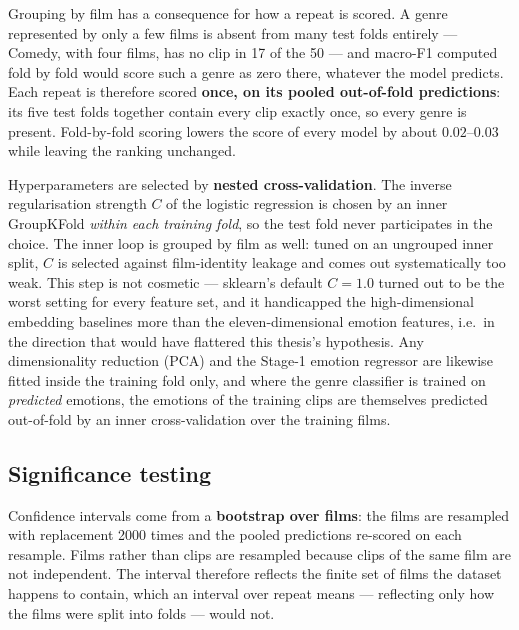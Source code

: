 Grouping by film has a consequence for how a repeat is scored. A genre represented by only
a few films is absent from many test folds entirely --- Comedy, with four films, has no
clip in 17 of the 50 --- and macro-F1 computed fold by fold would score such a genre as
zero there, whatever the model predicts. Each repeat is therefore scored \textbf{once, on
its pooled out-of-fold predictions}: its five test folds together contain every clip
exactly once, so every genre is present. Fold-by-fold scoring lowers the score of every
model by about $0.02$--$0.03$ while leaving the ranking unchanged.

Hyperparameters are selected by \textbf{nested cross-validation}. The inverse
regularisation strength $C$ of the logistic regression is chosen by an inner GroupKFold
\emph{within each training fold}, so the test fold never participates in the choice.
The inner loop is grouped by film as well: tuned on an ungrouped inner split, $C$ is
selected against film-identity leakage and comes out systematically too weak. This step
is not cosmetic --- sklearn's default $C=1.0$ turned out to be the worst setting for every
feature set, and it handicapped the high-dimensional embedding baselines more than the
eleven-dimensional emotion features, i.e.\ in the direction that would have flattered this
thesis's hypothesis. Any dimensionality reduction (PCA) and the Stage-1 emotion regressor
are likewise fitted inside the training fold only, and where the genre classifier is
trained on \emph{predicted} emotions, the emotions of the training clips are themselves
predicted out-of-fold by an inner cross-validation over the training films.

\subsection{Significance testing}

Confidence intervals come from a \textbf{bootstrap over films}: the films are resampled
with replacement 2000 times and the pooled predictions re-scored on each resample. Films
rather than clips are resampled because clips of the same film are not independent. The
interval therefore reflects the finite set of films the dataset happens to contain, which an
interval over repeat means --- reflecting only how the films were split into folds ---
would not.

